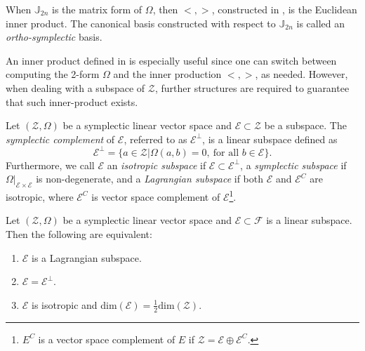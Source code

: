 \begin{corollary} \label{theorem:2.12}
When $\mathbb J_{2n}$ is the matrix form of $\Omega$, then $<,>$, constructed in , is the Euclidean inner product. The canonical basis constructed with respect to $\mathbb J_{2n}$ is called an \emph{ortho-symplectic} basis.
\end{corollary}

An inner product defined in  is especially useful since one can switch between computing the 2-form $\Omega$ and the inner production $<,>$, as needed. However, when dealing with a subspace of $\mathcal Z$, further structures are required to guarantee that such inner-product exists.

\begin{definition} \cite{abraham1978foundations}
Let $(\mathcal Z, \Omega)$ be a symplectic linear vector space and $\mathcal E \subset \mathcal Z$ be a subspace. The \emph{symplectic complement} of $\mathcal E$, referred to as $\mathcal E^{\perp}$, is a linear subspace defined as
\begin{equation*}
	\mathcal E^{\perp} = \{ a \in \mathcal Z | \Omega(a,b) = 0, \ \text{for all } b \in \mathcal E \}.
\end{equation*}
Furthermore, we call $\mathcal E$ an \emph{isotropic subspace} if $\mathcal E\subset \mathcal E^{\perp}$, a \emph{symplectic subspace} if $\Omega|_{\mathcal E\times \mathcal E}$ is non-degenerate, and a \emph{Lagrangian subspace} if both $\mathcal E$ and $\mathcal E^C$ are isotropic, where $\mathcal E^C$ is vector space complement of $\mathcal E$\footnote{$E^{C}$ is a vector space complement of $E$ if $\mathcal{Z} = \mathcal E\oplus \mathcal E^C$. }.
\end{definition}
\begin{proposition} \label{theorem:2.13} \cite{abraham1978foundations}
Let $(\mathcal Z, \Omega)$ be a symplectic linear vector space and $\mathcal E\subset \mathcal F$ is a linear subspace. Then the following are equivalent:
\begin{enumerate} [label=(\alph*)]
\item $\mathcal E$ is a Lagrangian subspace.
\item $\mathcal E = \mathcal E^{\perp}$.
\item $\mathcal E$ is isotropic and dim$(\mathcal E) = \frac 1 2 \text{dim}(\mathcal Z)$.
\end{enumerate}
\end{proposition}
